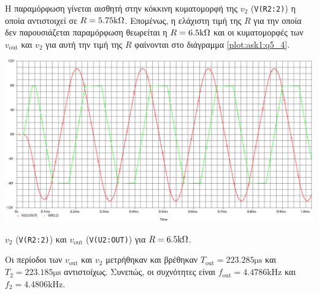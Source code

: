 Η παραμόρφωση γίνεται αισθητή στην κόκκινη κυματομορφή της $v_2$ (\texttt{V(R2:2)}) η οποία αντιστοιχεί σε $R=5.75\kohm$. Επομένως, η ελάχιστη τιμή της $R$ για την οποία δεν παρουσιάζεται παραμόρφωση θεωρείται η $R=6.5\kohm$ και οι κυματομορφές των $v_{\mathrm{out}}$ και $v_2$ για αυτή την  τιμή της $R$ φαίνονται στο διάγραμμα \ref{plot:ask1:q5_4}.

\begin{chart}[H]
	\begin{center}
		\includegraphics[width=15cm]{spice_01/q5_4.pdf}
		\caption{$v_2$ (\texttt{V(R2:2)}) και $v_{\mathrm{out}}$ (\texttt{V(U2:OUT)}) για $R=6.5\kohm$.}
		\label{plot:ask1:q5_4}
	\end{center}
\end{chart}

Οι περίοδοι των $v_{\mathrm{out}}$ και $v_2$ μετρήθηκαν και βρέθηκαν $T_{\mathrm{out}}=223.285\unit{\micro\second}$ και $T_{2}=223.185\unit{\micro\second}$ αντιστοίχως. Συνεπώς, οι συχνότητες είναι $f_{\mathrm{out}}=4.4786\unit{\kilo\hertz}$ και $f_2=4.4806\unit{\kilo\hertz}$.